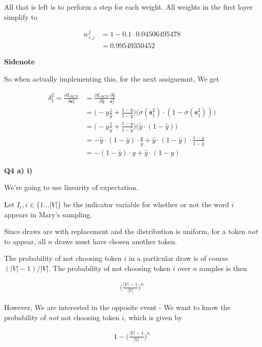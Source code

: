 \documentclass{article}
\begin{document}
	 All that is left is to perform a step for each weight. All weights in the first layer simplify to 
	 
	 \begin{align}
	 	w^1_{i, j} &= 1 - 0.1\cdot 0.04506495478\\
	 	&= 0.99549350452
	 \end{align}
	 
	 \textbf{Sidenote}
	 
	 So when actually implementing this, for the next assignemnt, We get 

	\begin{align}
	 	\delta^2_1 = \frac{\partial L_{BCE}}{\partial \mathbf{s}^2_1} &= \frac{\partial L_{BCE}}{\partial \hat{y}} \frac{\partial \hat{y}}{\mathbf{s}^2_1} \\
	 	&= \bigg( -y\frac{1}{\hat{y}}  + \frac{1-y}{1-\hat{y}} \bigg) \bigg( \sigma(\mathbf{s}^2_1)\cdot(1-\sigma(\mathbf{s}^2_1)) \bigg)\\
	 	&= \bigg( -y\frac{1}{\hat{y}}  + \frac{1-y}{1-\hat{y}} \bigg) \bigg(\hat{y}\cdot(1-\hat{y}) \bigg)\\
	 	&=  - \hat{y}\cdot(1-\hat{y})  \cdot \frac{y}{\hat{y}}  + \hat{y}\cdot(1-\hat{y}) \cdot \frac{1-y}{1-\hat{y}} \\
	 	&=  - (1-\hat{y})  \cdot y + \hat{y} \cdot (1-y)
	 \end{align}
	 
\newpage

\textbf{Q4 a) i)}

	We're going to use linearity of expectation.
	
	Let $I_i, i\in \{1\ldots |V|\}$ be the indicator variable for whether or not the word $i$ appears in Mary's sampling.
	
	Since draws are with replacement and the distribution is uniform, for a token \textit{not} to appear, all $n$ draws must have chosen another token. 
	
	The probability of not choosing token $i$ in a particular draw is of course $(|V|-1)/|V|$. The probability of not choosing token $i$ over $n$ samples is then
	
	\begin{align}
		\bigg(\frac{|V|-1}{|V|}\bigg)^n
	\end{align}
	
	However, We are interested in the opposite event - We want to know the probability of \textit{not} not choosing token $i$, which is given by
	
	\begin{align}
		1 - \bigg(\frac{|V|-1}{|V|}\bigg)^n
	\end{align}
	
\end{document}

